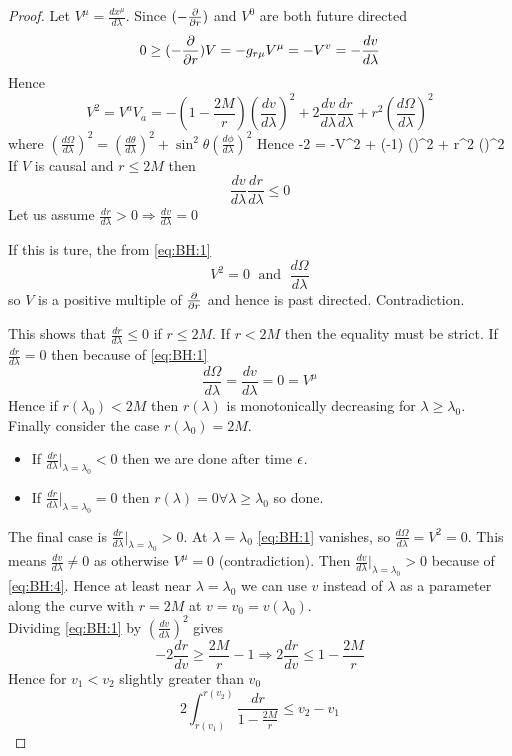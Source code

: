 \documentclass{article}
\begin{document}
\begin{proof}
Let $V^\mu = \frac{dx^\mu}{d\lambda}$. Since $(-\frac{\partial}{\partial r})$ and $V^0$ are both future directed 
\[
0 \geq (-\frac{\partial}{\partial r}) V = -g_{r\mu}V^\mu = -V^v = -\frac{dv}{d\lambda}
\]
\be \label{eq:BH:4}
\Rightarrow {} 
\ee
Hence 
\[
V^2 = V^a V_a = -(1-\frac{2M}{r}) (\frac{dv}{d\lambda})^2 + 2 \frac{dv}{d\lambda} \frac{dr}{d\lambda} + r^2 (\frac{d\Omega}{d\lambda})^2
\]
where $ (\frac{d\Omega}{d\lambda})^2 = (\frac{d\theta}{d\lambda})^2 + \sin^2 \theta (\frac{d\phi}{d\lambda})^2$
Hence 
\be \label{eq:BH:1}
-2  = -V^2 + (-1) ()^2 + r^2 ()^2
\ee
If $V$ is causal and $r\leq 2M$ then 
\[
\frac{dv}{d\lambda} \frac{dr}{d\lambda} \leq 0 
\]
Let us assume $\frac{dr}{d\lambda} > 0 \Rightarrow \frac{dv}{d\lambda} = 0$

If this is ture, the from \ref{eq:BH:1} 
\[
V^2 = 0 \; \text{ and } \; \frac{d\Omega}{d\lambda}
\]
so $V$ is a positive multiple of $\frac{\partial}{\partial r}$ and hence is past directed. Contradiction. 

This shows that $\frac{dr}{d\lambda} \leq 0 $ if $r\leq 2M$. If $r< 2M$ then the equality must be strict. If $\frac{dr}{d\lambda}=0$ then because of \ref{eq:BH:1} 
\[
\frac{d\Omega}{d\lambda} = \frac{dv}{d\lambda}=0 = V^\mu
\]
Hence if $r(\lambda_0)<2M$ then $r(\lambda)$ is monotonically decreasing for $\lambda \geq \lambda_0$. \\
Finally consider the case $r(\lambda_0)=2M$. 
\begin{itemize}
    \item If $\frac{dr}{d\lambda}\rvert_{\lambda=\lambda_0} <0$ then we are done after time $\epsilon$. 
    \item If $\frac{dr}{d\lambda}\rvert_{\lambda=\lambda_0} =0$ then $r(\lambda)=0 \forall \lambda \geq \lambda_0$ so done. 
\end{itemize}
The final case is $\frac{dr}{d\lambda}\rvert_{\lambda=\lambda_0}>0$. At $\lambda=\lambda_0$ \ref{eq:BH:1} vanishes, so $\frac{d\Omega}{d\lambda}=V^2=0$. This means $\frac{dv}{d\lambda} \neq 0 $ as otherwise $V^\mu=0$ (contradiction). Then $\frac{dv}{d\lambda}\rvert_{\lambda=\lambda_0} >0$ because of \ref{eq:BH:4}. Hence at least near $\lambda = \lambda_0$ we can use $v$ instead of $\lambda$ as a parameter along the curve with $r=2M$ at $v=v_0=v(\lambda_0)$. \\
Dividing \ref{eq:BH:1} by $(\frac{dv}{d\lambda})^2$ gives 
\[
-2\frac{dr}{dv} \geq \frac{2M}{r}-1 \Rightarrow 2\frac{dr}{dv} \leq 1-\frac{2M}{r}
\]
Hence for $v_1< v_2$ slightly greater than $v_0$ 
\[
2 \int_{r(v_1)}^{r(v_2)} \frac{dr}{1-\frac{2M}{r}} \leq v_2 - v_1
\]
\end{proof}
\end{document}
